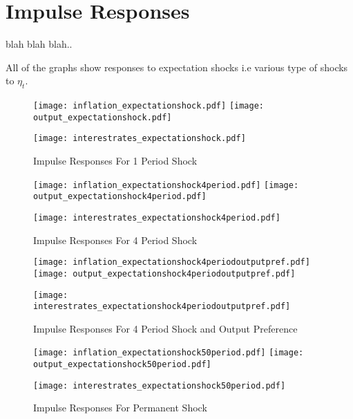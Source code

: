 \documentclass[12pt]{article}
\newcommand{\1}{\mathbbm 1}
\begin{document}
		\section{Impulse Responses}
		
		blah blah blah..
		
		
		
	All of the graphs show responses to expectation shocks i.e various type of shocks to $\eta_{t}$.
		
		
		
		
		
		
		\begin{figure}[H]
				\texttt{[image: inflation\_expectationshock.pdf]}
				\hfill
				\texttt{[image: output\_expectationshock.pdf]}
				\hfill
				\begin{Center}
				\texttt{[image: interestrates\_expectationshock.pdf]}
				\end{Center}
				\caption{Impulse Responses For 1 Period Shock}
		\end{figure}
		
		
			\begin{figure}[H]
			\texttt{[image: inflation\_expectationshock4period.pdf]}
			\hfill
			\texttt{[image: output\_expectationshock4period.pdf]}
			\hfill
			\begin{Center}
				\texttt{[image: interestrates\_expectationshock4period.pdf]}
			\end{Center}
			\caption{Impulse Responses For 4 Period Shock}
		\end{figure}
	
	
	\begin{figure}[H]
		\texttt{[image: inflation\_expectationshock4periodoutputpref.pdf]}
		\hfill
		\texttt{[image: output\_expectationshock4periodoutputpref.pdf]}
		\hfill
		\begin{Center}
			\texttt{[image: interestrates\_expectationshock4periodoutputpref.pdf]}
		\end{Center}
		\caption{Impulse Responses For 4 Period Shock and Output Preference}
	\end{figure}
	
	\begin{figure}[H]
		\texttt{[image: inflation\_expectationshock50period.pdf]}
		\hfill
		\texttt{[image: output\_expectationshock50period.pdf]}
		\hfill
		\begin{Center}
			\texttt{[image: interestrates\_expectationshock50period.pdf]}
		\end{Center}
		\caption{Impulse Responses For Permanent Shock}
	\end{figure}
\end{document}
